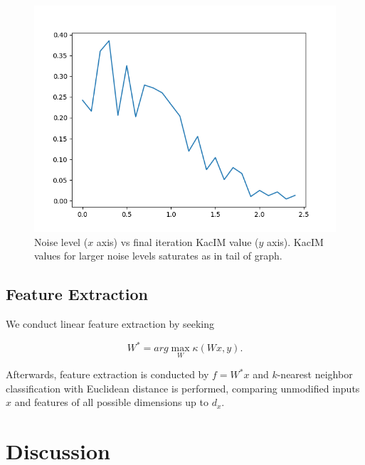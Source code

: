 \documentclass{article}
\begin{document}
\begin{figure}[t]
\label{fig:experiments_noise_level_effect}
\centering
\includegraphics[scale=0.50]{./noise_level_effect_to_kacim.png}
\caption{Noise level ($x$ axis) vs final iteration KacIM value ($y$ axis). KacIM values for larger noise levels saturates as in tail of graph.}
\end{figure}



\subsection{Feature Extraction}

We conduct linear feature extraction by seeking 

\begin{equation}
\label{eq:kim_feature_extraction}    
W^{*} = arg \max_{W} \kappa(Wx, y).
\end{equation}



\noindent Afterwards, feature extraction is conducted by $f = W^{*}x$ and $k$-nearest neighbor classification with Euclidean distance is performed, comparing unmodified inputs $x$ and features of all possible dimensions up to $d_{x}$.

\section{Discussion} 
\end{document}
